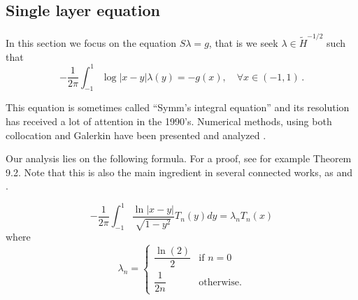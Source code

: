 \documentclass[a4paper]{article}
\begin{document}
	\subsection{Single layer equation}
	
	In this section we focus on the equation $S\lambda = g$, that is we seek $\lambda \in \tilde{H}^{-1/2}$ such that 
	\begin{equation}
	-\frac{1}{2\pi}\int_{-1}^{1} \log|x-y| \lambda(y) = -g(x), \quad \forall x\in (-1,1)\,.\label{Slambda}
	\end{equation} 
	
	This equation is sometimes called ``Symm's integral equation'' and its resolution has received a lot of attention in the 1990's. Numerical methods, using both collocation and Galerkin have been presented and analyzed \cite{atkinson1991numerical,yan1988integral,yan1990cosine,sloan1992collocation,yan1989mesh}. 
	
	
	Our analysis lies on the following formula. For a proof, see for example \cite{mason2002chebyshev} Theorem 9.2. Note that this is also the main ingredient in several connected works, as \cite{jiang2004second} and \cite{bruno2012second}.
	
	\begin{Prop}
		\[ -\frac{1}{2\pi}\int_{-1}^{1} \frac{\ln|x-y|}{\sqrt{1 - y^2}}T_n(y)dy = \lambda_n T_n(x)\]
		where
		\[\lambda_n = \begin{cases}
		\dfrac{\ln(2)}{2} & \text{if } n=0\\
		\dfrac{1}{2n} & \text{otherwise}.
		\end{cases}\]
		\label{STn}
	\end{Prop}
\end{document}
